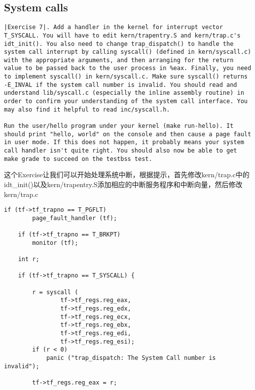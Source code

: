 \documentclass{article}
\newcommand{\funcname}[1]{{\ttfamily \small #1}}
\begin{document}
\begin{CJK*}{UTF8}{gkai}
\subsection{System calls}


\begin{lstlisting}[style=exercise]
|Exercise 7|. Add a handler in the kernel for interrupt vector T_SYSCALL. You will have to edit kern/trapentry.S and kern/trap.c's idt_init(). You also need to change trap_dispatch() to handle the system call interrupt by calling syscall() (defined in kern/syscall.c) with the appropriate arguments, and then arranging for the return value to be passed back to the user process in %eax. Finally, you need to implement syscall() in kern/syscall.c. Make sure syscall() returns -E_INVAL if the system call number is invalid. You should read and understand lib/syscall.c (especially the inline assembly routine) in order to confirm your understanding of the system call interface. You may also find it helpful to read inc/syscall.h.

Run the user/hello program under your kernel (make run-hello). It should print "hello, world" on the console and then cause a page fault in user mode. If this does not happen, it probably means your system call handler isn't quite right. You should also now be able to get make grade to succeed on the testbss test.
\end{lstlisting}

这个Exercise让我们可以开始处理系统中断，根据提示，首先修改kern/trap.c中的\funcname{idt\_init()}以及kern/trapentry.S添加相应的中断服务程序和中断向量，然后修改kern/trap.c

\begin{lstlisting}[style=ccode, title={\scriptsize \ttfamily \bfseries kern/trap.c: trap\_dispatch()}]
    if (tf->tf_trapno == T_PGFLT) 
        page_fault_handler (tf);

    if (tf->tf_trapno == T_BRKPT)
        monitor (tf);

    int r;

    if (tf->tf_trapno == T_SYSCALL) {
        
        r = syscall (
                tf->tf_regs.reg_eax, 
                tf->tf_regs.reg_edx, 
                tf->tf_regs.reg_ecx, 
                tf->tf_regs.reg_ebx, 
                tf->tf_regs.reg_edi, 
                tf->tf_regs.reg_esi); 
        if (r < 0)
            panic ("trap_dispatch: The System Call number is invalid");

        tf->tf_regs.reg_eax = r;


\end{lstlisting}
\end{CJK*}
\end{document}
